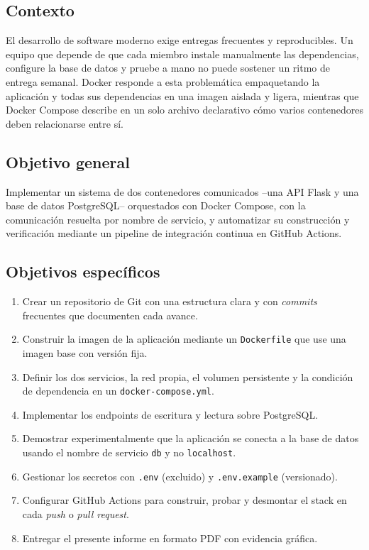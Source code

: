 \documentclass[12pt,a4paper]{article}
\begin{document}
\subsection{Contexto}

El desarrollo de software moderno exige entregas frecuentes y reproducibles. Un equipo que
depende de que cada miembro instale manualmente las dependencias, configure la base de
datos y pruebe a mano no puede sostener un ritmo de entrega semanal. Docker responde a
esta problem\'atica empaquetando la aplicaci\'on y todas sus dependencias en una imagen
aislada y ligera, mientras que Docker Compose describe en un solo archivo declarativo c\'omo
varios contenedores deben relacionarse entre s\'i.

\subsection{Objetivo general}

Implementar un sistema de dos contenedores comunicados --una API Flask y una base de
datos PostgreSQL-- orquestados con Docker Compose, con la comunicaci\'on resuelta por
nombre de servicio, y automatizar su construcci\'on y verificaci\'on mediante un pipeline
de integraci\'on continua en GitHub Actions.

\subsection{Objetivos espec\'ificos}

\begin{enumerate}
  \item Crear un repositorio de Git con una estructura clara y con \emph{commits} frecuentes
        que documenten cada avance.
  \item Construir la imagen de la aplicaci\'on mediante un \texttt{Dockerfile} que use una
        imagen base con versi\'on fija.
  \item Definir los dos servicios, la red propia, el volumen persistente y la condici\'on de
        dependencia en un \texttt{docker-compose.yml}.
  \item Implementar los endpoints de escritura y lectura sobre PostgreSQL.
  \item Demostrar experimentalmente que la aplicaci\'on se conecta a la base de datos
        usando el nombre de servicio \texttt{db} y no \texttt{localhost}.
  \item Gestionar los secretos con \texttt{.env} (excluido) y \texttt{.env.example}
        (versionado).
  \item Configurar GitHub Actions para construir, probar y desmontar el stack en cada
        \emph{push} o \emph{pull request}.
  \item Entregar el presente informe en formato PDF con evidencia gr\'afica.
\end{enumerate}
\end{document}
